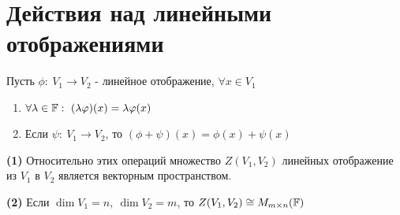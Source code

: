 \section{Действия над линейными отображениями}
    Пусть $\phi: \ V_1 \to V_2$ - линейное отображение, $\forall x \in V_1$ 
    \begin{enumerate}
        \item $\forall \lambda \in \mathbb F: \ (\lambda \varphi)(x) = \lambda \varphi(x)$
        \item Если $\psi: \ V_1 \to V_2$, то $(\phi + \psi)(x) = \phi(x) + \psi(x)$   
    \end{enumerate}
    \begin{subtheorem} \textbf{(1)} 
        Относительно этих операций множество $Z(V_1,V_2)$ линейных отображение из $V_1$ в $V_2$ является векторным пространством.   
    \end{subtheorem}
    \begin{subtheorem} \textbf{(2)}
        Если $\dim V_1 = n, \ \dim V_2 = m$, то $Z(V_1, V_2) \cong M_{m\times n}(\mathbb F)$  
    \end{subtheorem}

